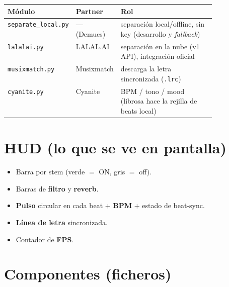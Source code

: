 \documentclass[11pt]{article}
\newcommand{\code}[1]{\texttt{#1}}
\begin{document}
\begin{center}
\begin{tabular}{@{}l l p{0.48\linewidth}@{}}
\toprule
\textbf{Módulo} & \textbf{Partner} & \textbf{Rol} \\
\midrule
\code{separate\_local.py} & --- (Demucs) & separación local/offline, sin key (desarrollo y \emph{fallback}) \\
\code{lalalai.py} & LALAL.AI & separación en la nube (v1 API), integración oficial \\
\code{musixmatch.py} & Musixmatch & descarga la letra sincronizada (\code{.lrc}) \\
\code{cyanite.py} & Cyanite & BPM / tono / mood (librosa hace la rejilla de beats local) \\
\bottomrule
\end{tabular}
\end{center}

\section{HUD (lo que se ve en pantalla)}
\begin{itemize}
  \item Barra por stem (verde $=$ ON, gris $=$ off).
  \item Barras de \textbf{filtro} y \textbf{reverb}.
  \item \textbf{Pulso} circular en cada beat $+$ \textbf{BPM} $+$ estado de beat-sync.
  \item \textbf{Línea de letra} sincronizada.
  \item Contador de \textbf{FPS}.
\end{itemize}

\section{Componentes (ficheros)}
\end{document}
